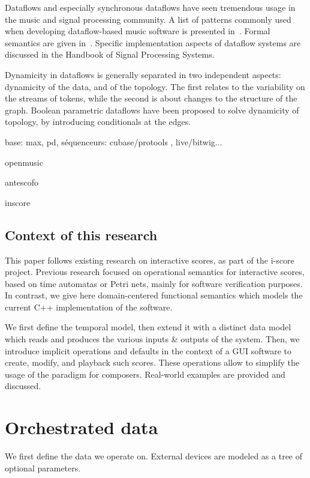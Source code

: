 \documentclass[applsci,article,submit,moreauthors,pdftex,10pt,a4paper]{mdpi}
\begin{document}
Dataflows and especially synchronous dataflows have seen tremendous usage in the music and signal processing community. 
A list of patterns commonly used when developing dataflow-based music software is presented in~\cite{arumi2006dataflow}.
Formal semantics are given in~\cite{benveniste_data-flow_1993}.
Specific implementation aspects of dataflow systems are discussed in the Handbook of Signal Processing Systems\cite{bhattacharyya_handbook_2013}. 

Dynamicity in dataflows is generally separated in two independent aspects: dynamicity of the data, and of the topology.
The first relates to the variability on the streams of tokens, while the second is about changes to the structure of the graph. 
Boolean parametric dataflows\cite{bempelis2015boolean} have been proposed to solve dynamicity of topology, by introducing conditionals at the edges.

base: max, pd, séquenceurs: cubase/protools , live/bitwig...

openmusic

antescofo

inscore


\subsection{Context of this research}
This paper follows existing research on interactive scores, as part of the i-score project.
Previous research focused on operational semantics for interactive scores, based on time automatas\cite{arias2016authoring} or Petri nets\cite{allombert2007system}, mainly for software verification purposes. 
In contrast, we give here domain-centered functional semantics which models the current C++ implementation of the software.

We first define the temporal model, then extend it with a distinct data model which reads and produces the various inputs \& outputs of the system. 
Then, we introduce implicit operations and defaults in the context of a GUI software to create, modify, and playback such scores. These operations allow to simplify the usage of the paradigm for composers.
Real-world examples are provided and discussed.

\cite{celerier2017icmc}
\section{Orchestrated data}\label{sec.device}
We first define the data we operate on.
External devices are modeled as a tree of optional parameters.
\end{document}
